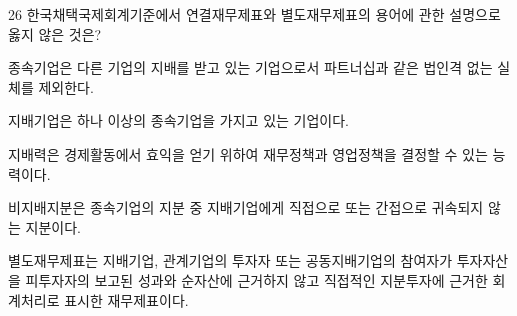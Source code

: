 \begin{question}{26}
한국채택국제회계기준에서 연결재무제표와 별도재무제표의 용어에 관한 설명으로 옳지 않은 것은?
\begin{choices}
  \item 종속기업은 다른 기업의 지배를 받고 있는 기업으로서 파트너십과 같은 법인격 없는 실체를 제외한다.
  \item 지배기업은 하나 이상의 종속기업을 가지고 있는 기업이다.
  \item 지배력은 경제활동에서 효익을 얻기 위하여 재무정책과 영업정책을 결정할 수 있는 능력이다.
  \item 비지배지분은 종속기업의 지분 중 지배기업에게 직접으로 또는 간접으로 귀속되지 않는 지분이다.
  \item 별도재무제표는 지배기업, 관계기업의 투자자 또는 공동지배기업의 참여자가 투자자산을 피투자자의 보고된 성과와 순자산에 근거하지 않고 직접적인 지분투자에 근거한 회계처리로 표시한 재무제표이다.
\end{choices}
\end{question}

